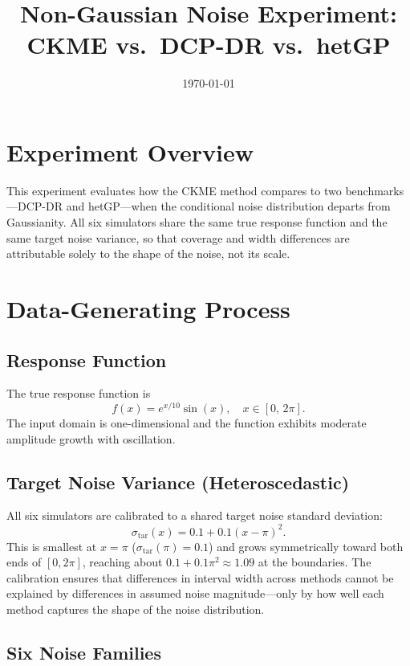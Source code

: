 \documentclass[11pt]{article}
\title{Non-Gaussian Noise Experiment: \\
       CKME vs.\ DCP-DR vs.\ hetGP}
\author{}
\date{\today}
\begin{document}
\maketitle

\section{Experiment Overview}

This experiment evaluates how the CKME method compares to two benchmarks---DCP-DR and hetGP---when the conditional noise distribution departs from Gaussianity.
All six simulators share the same true response function and the same target noise variance, so that coverage and width differences are attributable solely to the shape of the noise, not its scale.

\section{Data-Generating Process}

\subsection{Response Function}

The true response function is
\[
  f(x) = e^{x/10}\sin(x), \quad x \in [0,\, 2\pi].
\]
The input domain is one-dimensional and the function exhibits moderate amplitude growth with oscillation.

\subsection{Target Noise Variance (Heteroscedastic)}

All six simulators are calibrated to a shared target noise standard deviation:
\[
  \sigma_{\mathrm{tar}}(x) = 0.1 + 0.1(x - \pi)^2.
\]
This is smallest at $x = \pi$ ($\sigma_{\mathrm{tar}}(\pi) = 0.1$) and grows symmetrically toward both ends of $[0, 2\pi]$, reaching about $0.1 + 0.1\pi^2 \approx 1.09$ at the boundaries.
The calibration ensures that differences in interval width across methods cannot be explained by differences in assumed noise magnitude---only by how well each method captures the shape of the noise distribution.

\subsection{Six Noise Families}
\end{document}
